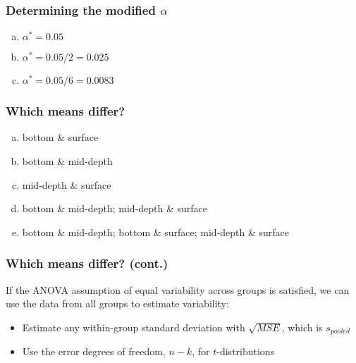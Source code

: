 \documentclass[slidestop,compress,mathserif]{beamer}
\makeatletter
\def\chp7@path{../../Chp 7}
\makeatother
\begin{document}

\begin{frame}
\frametitle{Determining the modified $\alpha$}


\begin{enumerate}[(a)]
\item $\alpha^* = 0.05$
\item $\alpha^* = 0.05 / 2 = 0.025$
\item $\alpha^* = 0.05 / 6 = 0.0083$
\end{enumerate}

\end{frame}


\begin{frame}
\frametitle{Which means differ?}


{
\begin{enumerate}[(a)]
\item bottom \& surface
\item bottom \& mid-depth
\item mid-depth \& surface
\item bottom \& mid-depth; mid-depth \& surface
\item bottom \& mid-depth; bottom \& surface; mid-depth \& surface
\end{enumerate}
}

\end{frame}


\begin{frame}
\frametitle{Which means differ? (cont.)}

If the ANOVA assumption of equal variability across groups is satisfied, we can use the data from all groups to estimate variability:
    
\begin{itemize}

\item Estimate any within-group standard deviation with $\sqrt{MSE}$, which is $s_{pooled}$

\item Use the error degrees of freedom, $n - k$, for $t$-distributions

\end{itemize}


\end{frame}
\end{document}
